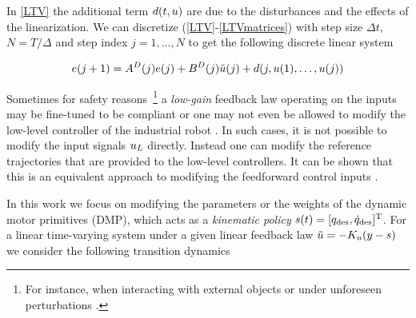 \noindent In \eqref{LTV} the additional term $d(t,u)$ are due to the disturbances and the effects of the linearization. We can discretize (\ref{LTV}-\ref{LTVmatrices}) with step size $\Delta t$, $N = T/\Delta$ and step index $j = 1, \ldots, N$ to get the following discrete linear system

\begin{equation}
\begin{aligned}
e(j+1) = A^{D}(j)e(j) + B^{D}(j)\tilde{u}(j) + d(j, u(1), \ldots, u(j))
\end{aligned}
\label{discreteLTV}
\end{equation}

Sometimes for safety reasons~\footnote{For instance, when interacting with external objects or under unforeseen perturbations \cite{Schaal07}.} a \emph{low-gain} feedback law operating on the inputs may be fine-tuned to be compliant or one may not even be allowed to modify the low-level controller of the industrial robot \cite{Longman2000}. In such cases, it is not possible to modify the input signals $u_L$ directly. Instead one can modify the reference trajectories that are provided to the low-level controllers. It can be shown that this is an equivalent approach to modifying the feedforward control inputs \cite{Bristow06}.

In this work we focus on modifying the parameters or the weights of the dynamic motor primitives (DMP), which acts as a \emph{kinematic policy} $s(t) = [q_{\text{des}},\dot{q}_{\text{des}}]^{\mathrm{T}}$. For a linear time-varying system under a given linear feedback law $\tilde{u} = -K_u(y - s)$ we consider the following transition dynamics

